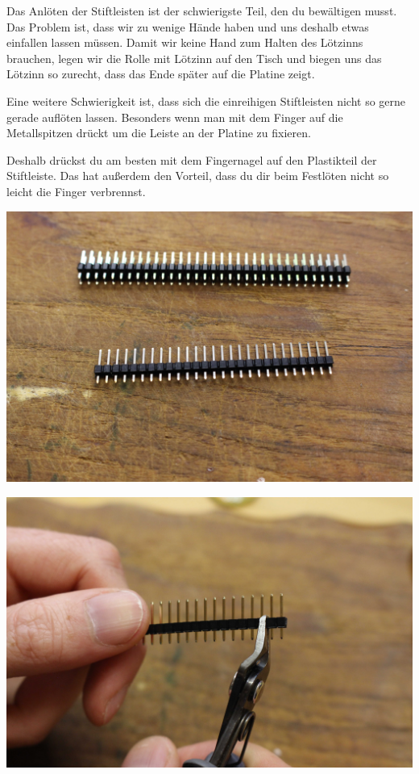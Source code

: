 \documentclass{article}
\begin{document}
Das Anlöten der Stiftleisten ist der schwierigste Teil, den du bewältigen musst. Das Problem ist, dass wir zu wenige Hände haben und uns deshalb etwas einfallen lassen müssen. Damit wir keine Hand zum Halten des Lötzinns brauchen, legen wir die Rolle mit Lötzinn auf den Tisch und biegen uns das Lötzinn so zurecht, dass das Ende später auf die Platine zeigt.

Eine weitere Schwierigkeit ist, dass sich die einreihigen Stiftleisten nicht so gerne gerade auflöten lassen. Besonders wenn man mit dem Finger auf die Metallspitzen drückt um die Leiste an der Platine zu fixieren.

Deshalb drückst du am besten mit dem Fingernagel auf den Plastikteil der Stiftleiste. Das hat außerdem den Vorteil, dass du dir beim Festlöten nicht so leicht die Finger verbrennst.

\vspace{1cm}

\begin{minipage}[b]{0.5\textwidth}
	\includegraphics[width=\textwidth]{Bilder/IMG_5601.JPG}
\end{minipage}
\begin{minipage}[b]{0.5\textwidth}
	\includegraphics[width=\textwidth]{Bilder/IMG_5603.JPG}
\end{minipage}
\end{document}
